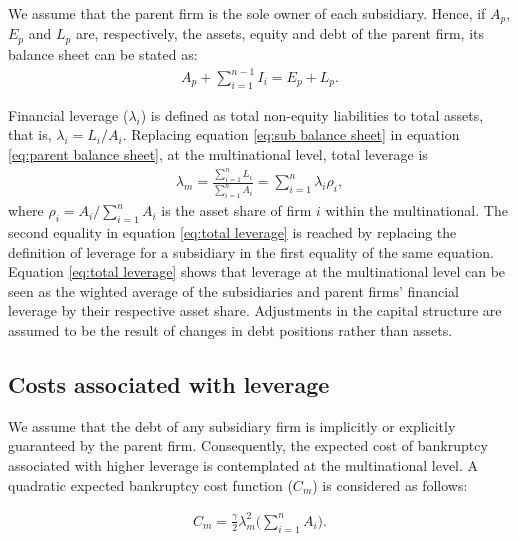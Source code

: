 \documentclass[12pt]{article}
\begin{document}
	We assume that the parent firm is the sole owner of each subsidiary. Hence, if $A_p$, $E_p$ and $L_p$ are, respectively, the assets, equity and debt of the parent firm, its balance sheet can be stated as: 
	\begin{equation}
	\begin{aligned}
	A_p+\sum_{i=1}^{n-1}I_i=E_p+L_p. 
	\end{aligned}
	\label{eq:parent balance sheet}
	\end{equation}
	
	Financial leverage ($\lambda_i$) is defined as total non-equity liabilities to total assets, that is, $\lambda_i=L_i/A_i$. Replacing equation \ref{eq:sub balance sheet} in equation \ref{eq:parent balance sheet}, at the multinational level, total leverage is
	\begin{equation}
	\begin{aligned}
	\lambda_m=\frac{\sum_{i=1}^{n}L_i}{\sum_{i=1}^{n}A_i}=\sum_{i=1}^{n}\lambda_i\rho_i, 
	\end{aligned}
	\label{eq:total leverage}
	\end{equation} 
	where $\rho_i=A_i/\sum_{i=1}^{n}A_i$ is the asset share of firm $i$ within the multinational. The second equality in equation \ref{eq:total leverage} is reached by replacing the definition of leverage for a subsidiary in the first equality of the same equation. Equation \ref{eq:total leverage} shows that leverage at the multinational level can be seen as the wighted average of the subsidiaries and parent firms' financial leverage by their respective asset share. Adjustments in the capital structure are assumed to be the result of changes in debt positions rather than assets. 
	
	\subsection{Costs associated with leverage}
	\label{subsec:costs}
	We assume that the debt of any subsidiary firm is implicitly or explicitly guaranteed by the parent firm. Consequently, the expected cost of bankruptcy associated with higher leverage is contemplated at the multinational level. A quadratic expected bankruptcy cost function ($C_m$) is considered as follows:
	
	\begin{equation}
	\begin{aligned}
	C_m=\frac{\gamma}{2}\lambda_m^2\bigg(\sum_{i=1}^{n}A_i\bigg).
	\end{aligned}
	\label{eq:cost bankruptcy}
	\end{equation}
	
\end{document}
